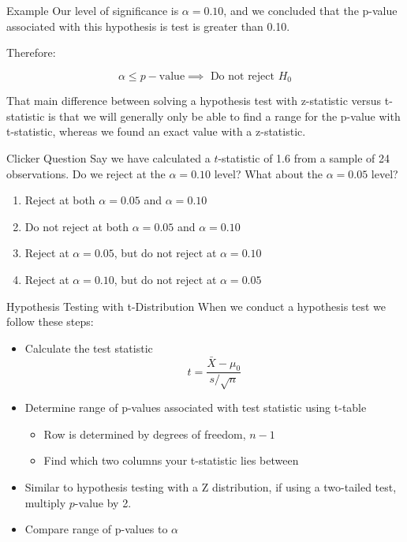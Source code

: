 \documentclass{beamer}
\begin{document}
\begin{frame}{Example}
	Our level of significance is $\alpha=0.10$, and we concluded that the p-value associated with this hypothesis is test is greater than 0.10. 
	
	Therefore:
	
	\[
		\alpha \leq p-\text{value} \implies \text{ Do not reject } H_0
	\]

	That main difference between solving a hypothesis test with z-statistic versus t-statistic is that we will generally only be able to find a range for the p-value with t-statistic, whereas we found an exact value with a z-statistic.
\end{frame}


\begin{frame}{Clicker Question}
	Say we have calculated a $t$-statistic of 1.6 from a sample of 24 observations. Do we reject at the $\alpha=0.10$ level? What about the $\alpha=0.05$ level?
	
	\begin{enumerate}[label=(\alph*)]
		\item Reject at both $\alpha=0.05$ and $\alpha=0.10$
		\item Do not reject at both $\alpha=0.05$ and $\alpha=0.10$
		\item Reject at $\alpha=0.05$, but do not reject at  $\alpha=0.10$
		\item Reject at $\alpha=0.10$, but do not reject at  $\alpha=0.05$
	\end{enumerate}
\end{frame}


\begin{frame}{Hypothesis Testing with t-Distribution}
	When we conduct a hypothesis test we follow these steps:
	\begin{itemize}
		\item Calculate the test statistic
		      $$t=\frac{\bar{X}-\mu_0}{s/\sqrt{n}}$$
		
		\item Determine range of p-values associated with test statistic using t-table
			\begin{itemize}
		      	\item Row is determined by degrees of freedom, $n-1$
		      	\item Find which two columns your t-statistic lies between
			\end{itemize}
		
		\item Similar to hypothesis testing with a Z distribution, if using a two-tailed test, multiply $p$-value by 2.
		
		\item Compare range of p-values to $\alpha$
	\end{itemize}
\end{frame}
\end{document}
